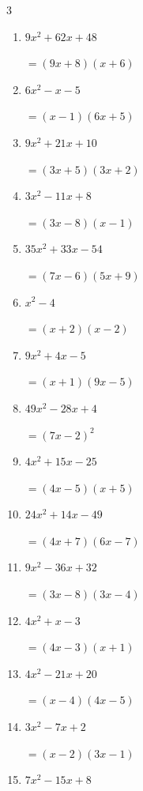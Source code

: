 \begin{multicols}{3}
\begin{enumerate}
\columnbreak %

\resetques

  \item $9x^{2}+62x+48$

        $=(9x+8)(x+6)$

  \item $6x^{2}-x-5$

        $=(x-1)(6x+5)$

  \item $9x^{2}+21x+10$

        $=(3x+5)(3x+2)$

  \item $3x^{2}-11x+8$

        $=(3x-8)(x-1)$

  \item $35x^{2}+33x-54$

        $=(7x-6)(5x+9)$

  \item $x^{2}-4$

        $=(x+2)(x-2)$

  \item $9x^{2}+4x-5$

        $=(x+1)(9x-5)$

  \item $49x^{2}-28x+4$

        $=(7x-2)^{2}$

  \item $4x^{2}+15x-25$

        $=(4x-5)(x+5)$

  \item $24x^{2}+14x-49$

        $=(4x+7)(6x-7)$

\columnbreak %

  \item $9x^{2}-36x+32$

        $=(3x-8)(3x-4)$

  \item $4x^{2}+x-3$

        $=(4x-3)(x+1)$

  \item $4x^{2}-21x+20$

        $=(x-4)(4x-5)$

  \item $3x^{2}-7x+2$

        $=(x-2)(3x-1)$

  \item $7x^{2}-15x+8$


\end{enumerate}
\end{multicols}
